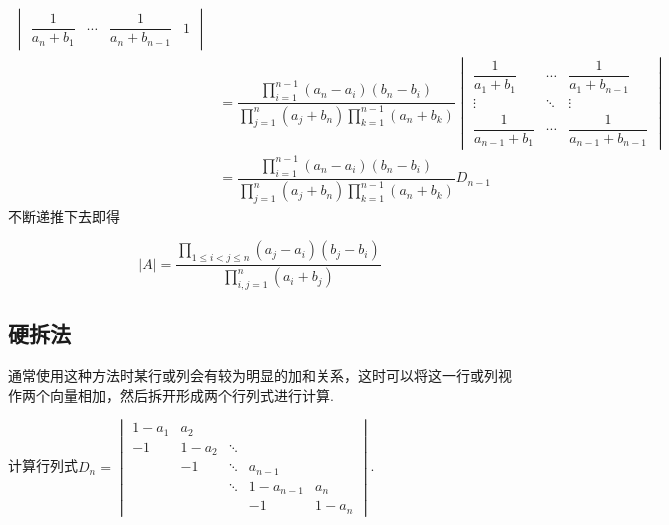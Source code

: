\begin{solution}
\begin{align*}
\begin{vmatrix}
            \dfrac{1}{a_n+b_1} & \cdots & \dfrac{1}{a_n+b_{n-1}} & 1
        \end{vmatrix} \\
        &= \dfrac{\prod\limits_{i=1}^{n-1}(a_n-a_i)(b_n-b_i)}{\prod\limits_{j=1}^{n}(a_j+b_n)\prod\limits_{k=1}^{n-1}(a_n+b_k)} \begin{vmatrix}
            \dfrac{1}{a_1+b_1} & \cdots & \dfrac{1}{a_1+b_{n-1}} \\
            \vdots & \ddots & \vdots \\
            \dfrac{1}{a_{n-1}+b_1} & \cdots & \dfrac{1}{a_{n-1}+b_{n-1}}
        \end{vmatrix} \\
        &= \dfrac{\prod\limits_{i=1}^{n-1}(a_n-a_i)(b_n-b_i)}{\prod\limits_{j=1}^{n}(a_j+b_n)\prod\limits_{k=1}^{n-1}(a_n+b_k)} D_{n-1}
    \end{align*}
    不断递推下去即得

    \[|A| = \dfrac{\prod\limits_{1 \leqslant i < j \leqslant n}(a_j - a_i)(b_j - b_i)}{\prod\limits_{i,j=1}^{n}(a_i + b_j)}\]
\end{solution}

\subsection{硬拆法}

通常使用这种方法时某行或列会有较为明显的加和关系，这时可以将这一行或列视作两个向量相加，然后拆开形成两个行列式进行计算.

\begin{example}{}{}
    计算行列式$D_n=\begin{vmatrix}
            1-a_{1} & a_{2}   &        &           &         \\
            -1      & 1-a_{2} & \ddots &           &         \\
                    & -1      & \ddots & a_{n-1}   &         \\
                    &         & \ddots & 1-a_{n-1} & a_{n}   \\
                    &         &        & -1        & 1-a_{n}
        \end{vmatrix}$.
\end{example}

